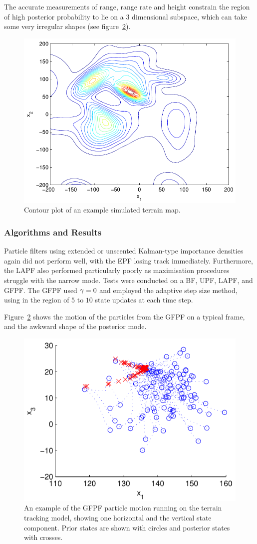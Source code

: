 \documentclass{article}
\begin{document}
The accurate measurements of range, range rate and height constrain the region of high posterior probability to lie on a $3$ dimensional subspace, which can take some very irregular shapes (see figure~\ref{fig:drone_example_frame_deterministic}).
%
\begin{figure}
\centering
\includegraphics[width=0.7\columnwidth]{drone_terrain_map.pdf}
\caption{Contour plot of an example simulated terrain map.}
\label{fig:drone_terrain_map}
\end{figure}

\subsubsection{Algorithms and Results}

Particle filters using extended or unscented Kalman-type importance densities again did not perform well, with the EPF losing track immediately. Furthermore, the LAPF also performed particularly poorly as maximisation procedures struggle with the narrow mode. Tests were conducted on a BF, UPF, LAPF, and GFPF. The GFPF used $\gamma=0$ and employed the adaptive step size method, using in the region of $5$ to $10$ state updates at each time step.

Figure~\ref{fig:drone_example_frame_deterministic} shows the motion of the particles from the GFPF on a typical frame, and the awkward shape of the posterior mode.
%
\begin{figure}
\centering
\includegraphics[width=0.7\columnwidth]{drone_example_frame_deter.pdf}
\caption{An example of the GFPF particle motion running on the terrain tracking model, showing one horizontal and the vertical state component. Prior states are shown with circles and posterior states with crosses.}
\label{fig:drone_example_frame_deterministic}
\end{figure}
\end{document}

